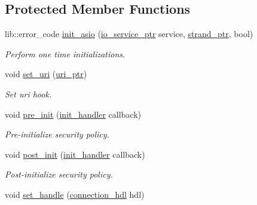 \subsection*{Protected Member Functions}
\begin{DoxyCompactItemize}
\item 
lib\+::error\+\_\+code \mbox{\hyperlink{classwebsocketpp_1_1transport_1_1asio_1_1basic__socket_1_1connection_ac458885eaebea790795dbe5e7ab62dc9}{init\+\_\+asio}} (\mbox{\hyperlink{classwebsocketpp_1_1transport_1_1asio_1_1basic__socket_1_1connection_af4c876008bd8610fb497c5d5be56faab}{io\+\_\+service\+\_\+ptr}} service, \mbox{\hyperlink{classwebsocketpp_1_1transport_1_1asio_1_1basic__socket_1_1connection_aed8283ac4f3aa27ada9cd899d579e497}{strand\+\_\+ptr}}, bool)
\begin{DoxyCompactList}\small\item\em Perform one time initializations. \end{DoxyCompactList}\item 
void \mbox{\hyperlink{classwebsocketpp_1_1transport_1_1asio_1_1basic__socket_1_1connection_a303d114dca4ca6ce161fca608e1a7138}{set\+\_\+uri}} (\mbox{\hyperlink{namespacewebsocketpp_aae370ea5ac83a8ece7712cb39fc23f5b}{uri\+\_\+ptr}})
\begin{DoxyCompactList}\small\item\em Set uri hook. \end{DoxyCompactList}\item 
void \mbox{\hyperlink{classwebsocketpp_1_1transport_1_1asio_1_1basic__socket_1_1connection_ab49994bd223b8d0a2eaa11d0029a1b78}{pre\+\_\+init}} (\mbox{\hyperlink{namespacewebsocketpp_1_1transport_aeae75e675c1a334b3b33ab7120b480a5}{init\+\_\+handler}} callback)
\begin{DoxyCompactList}\small\item\em Pre-\/initialize security policy. \end{DoxyCompactList}\item 
void \mbox{\hyperlink{classwebsocketpp_1_1transport_1_1asio_1_1basic__socket_1_1connection_abeee4b73e1f47d21dd42e455f1272d64}{post\+\_\+init}} (\mbox{\hyperlink{namespacewebsocketpp_1_1transport_aeae75e675c1a334b3b33ab7120b480a5}{init\+\_\+handler}} callback)
\begin{DoxyCompactList}\small\item\em Post-\/initialize security policy. \end{DoxyCompactList}\item 
void \mbox{\hyperlink{classwebsocketpp_1_1transport_1_1asio_1_1basic__socket_1_1connection_aac8318bcf892664a4f66a1f1435ed5ce}{set\+\_\+handle}} (\mbox{\hyperlink{namespacewebsocketpp_a6b3d26a10ee7229b84b776786332631d}{connection\+\_\+hdl}} hdl)

\end{DoxyCompactItemize}
